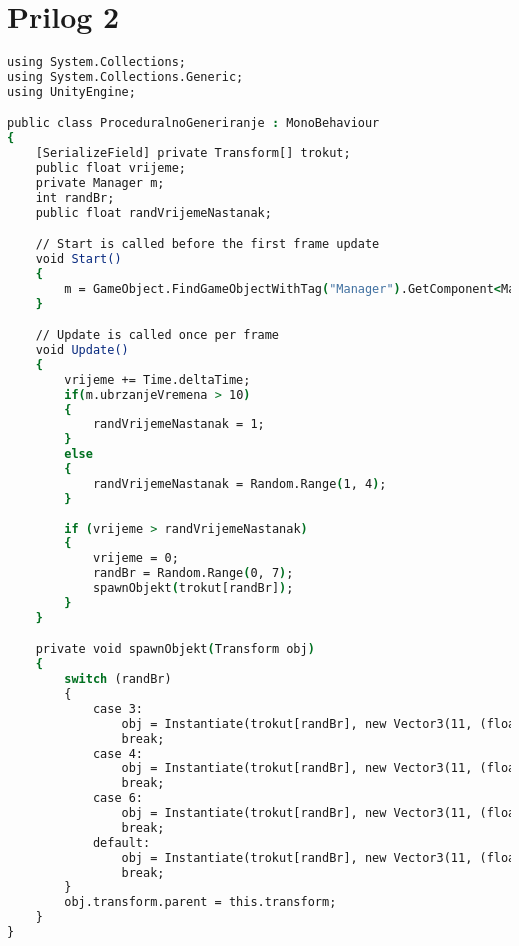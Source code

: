 \documentclass[]{foi} %
\begin{document}
\chapter{Prilog 2} %
\label{cha: prilog 2}
\begin{lstlisting}[language=csh, caption={Prikaz klase za proceduralno generiranje neprijatelja}]
using System.Collections;
using System.Collections.Generic;
using UnityEngine;

public class ProceduralnoGeneriranje : MonoBehaviour
{
    [SerializeField] private Transform[] trokut;
    public float vrijeme;
    private Manager m;
    int randBr;
    public float randVrijemeNastanak;

    // Start is called before the first frame update
    void Start()
    {
        m = GameObject.FindGameObjectWithTag("Manager").GetComponent<Manager>();
    }

    // Update is called once per frame
    void Update()
    {
        vrijeme += Time.deltaTime;
        if(m.ubrzanjeVremena > 10)
        {
            randVrijemeNastanak = 1;
        }
        else
        {
            randVrijemeNastanak = Random.Range(1, 4);
        }
        
        if (vrijeme > randVrijemeNastanak)
        {
            vrijeme = 0;
            randBr = Random.Range(0, 7);
            spawnObjekt(trokut[randBr]);
        }
    }

    private void spawnObjekt(Transform obj)
    {
        switch (randBr)
        {
            case 3:
                obj = Instantiate(trokut[randBr], new Vector3(11, (float)-1.7), Quaternion.identity);
                break;
            case 4:
                obj = Instantiate(trokut[randBr], new Vector3(11, (float)-2.32), Quaternion.identity);
                break;
            case 6:
                obj = Instantiate(trokut[randBr], new Vector3(11, (float)-2.75), Quaternion.identity);
                break;
            default:
                obj = Instantiate(trokut[randBr], new Vector3(11, (float)-3.24), Quaternion.identity);
                break;
        }
        obj.transform.parent = this.transform;
    }
}
\end{lstlisting}
\end{document}
